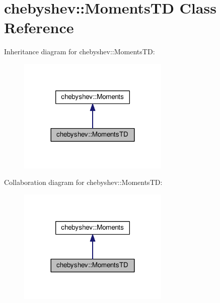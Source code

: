 \hypertarget{classchebyshev_1_1_moments_t_d}{}\section{chebyshev\+:\+:Moments\+TD Class Reference}
\label{classchebyshev_1_1_moments_t_d}


Inheritance diagram for chebyshev\+:\+:Moments\+TD\+:\nopagebreak
\begin{figure}[H]
\begin{center}
\leavevmode
\includegraphics[width=204pt]{classchebyshev_1_1_moments_t_d__inherit__graph}
\end{center}
\end{figure}


Collaboration diagram for chebyshev\+:\+:Moments\+TD\+:\nopagebreak
\begin{figure}[H]
\begin{center}
\leavevmode
\includegraphics[width=204pt]{classchebyshev_1_1_moments_t_d__coll__graph}
\end{center}
\end{figure}
